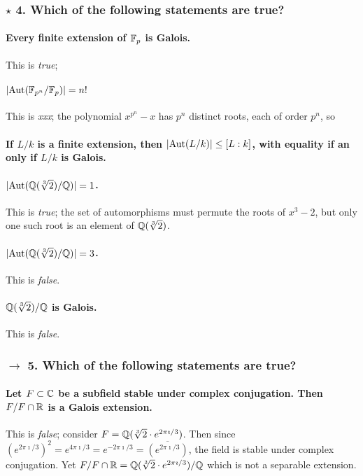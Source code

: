 \subsubsection*{$\star$ 4. Which of the following statements are true?}
\paragraph*{Every finite extension of $\mathbb{F}_p$ is Galois.} This is \emph{true}; %

\paragraph*{$|\mathrm{Aut}(\mathbb{F}_{p^n} / \mathbb{F}_p)| = n!$} This is \emph{xxx}; the polynomial $x^{p^n} - x$ has $p^n$ distinct roots, each of order $p^n$, so 

\paragraph*{If $L / k$ is a finite extension, then $|\mathrm{Aut}(L / k)| \leq [L : k]$, with equality if an only if $L / k$ is Galois.}

\paragraph*{$|\mathrm{Aut}(\mathbb{Q}(\sqrt[3]{2}) / \mathbb{Q})| = 1$.} This is \emph{true}; the set of automorphisms must permute the roots of $x^3 - 2$, but only one such root is an element of $\mathbb{Q}(\sqrt[3]{2})$.

\paragraph*{$|\mathrm{Aut}(\mathbb{Q}(\sqrt[3]{2}) / \mathbb{Q})| = 3$.} This is \emph{false}.

\paragraph*{$\mathbb{Q}(\sqrt[3]{2})/ \mathbb{Q}$ is Galois.} This is \emph{false}.

\subsubsection*{$\rightarrow$ 5. Which of the following statements are true?}

\paragraph*{Let $F \subset \mathbb{C}$ be a subfield stable under complex conjugation. Then $F / F \cap \mathbb{R}$ is a Galois extension.} This is \emph{false}; consider $F = \mathbb{Q}(\sqrt[3]{2} \cdot e^{2\pi\imath / 3})$. Then since $(e^{2\pi\imath / 3})^2 = e^{4\pi\imath / 3} = e^{-2\pi\imath / 3} = \overline{(e^{2\pi\imath / 3})}$, the field is stable under complex conjugation. Yet $F / F \cap \mathbb{R} = \mathbb{Q}(\sqrt[3]{2} \cdot e^{2\pi\imath / 3}) / \mathbb{Q}$ which is not a separable extension.

